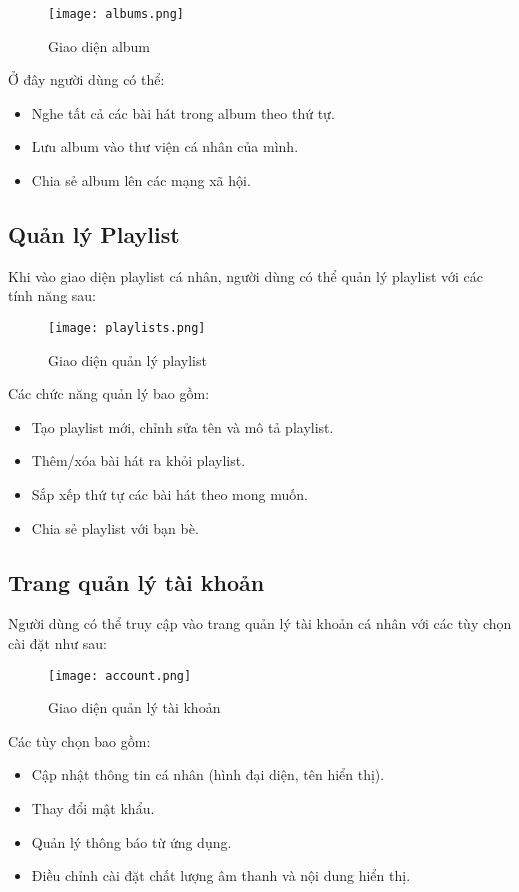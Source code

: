 \documentclass[a4paper]{article}
\begin{document}
\begin{figure}[!htb]
    \centering
    \texttt{[image: albums.png]}
    \caption{Giao diện album}
    \label{fig:album}
\end{figure}

Ở đây người dùng có thể:
\begin{itemize}
    \item Nghe tất cả các bài hát trong album theo thứ tự.
    \item Lưu album vào thư viện cá nhân của mình.
    \item Chia sẻ album lên các mạng xã hội.
\end{itemize}

\subsection{Quản lý Playlist}

Khi vào giao diện playlist cá nhân, người dùng có thể quản lý playlist với các tính năng sau:

\begin{figure}[!htb]
    \centering
    \texttt{[image: playlists.png]}
    \caption{Giao diện quản lý playlist}
    \label{fig:playlist}
\end{figure}

Các chức năng quản lý bao gồm:
\begin{itemize}
    \item Tạo playlist mới, chỉnh sửa tên và mô tả playlist.
    \item Thêm/xóa bài hát ra khỏi playlist.
    \item Sắp xếp thứ tự các bài hát theo mong muốn.
    \item Chia sẻ playlist với bạn bè.
\end{itemize}

\subsection{Trang quản lý tài khoản}

Người dùng có thể truy cập vào trang quản lý tài khoản cá nhân với các tùy chọn cài đặt như sau:

\begin{figure}[!htb]
    \centering
    \texttt{[image: account.png]}
    \caption{Giao diện quản lý tài khoản}
    \label{fig:account}
\end{figure}

Các tùy chọn bao gồm:
\begin{itemize}
    \item Cập nhật thông tin cá nhân (hình đại diện, tên hiển thị).
    \item Thay đổi mật khẩu.
    \item Quản lý thông báo từ ứng dụng.
    \item Điều chỉnh cài đặt chất lượng âm thanh và nội dung hiển thị.
\end{itemize}
\end{document}
